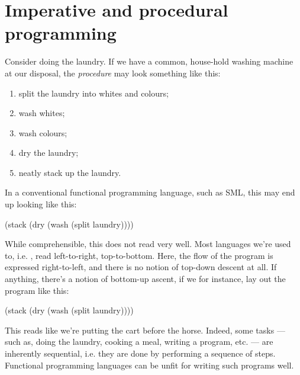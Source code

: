 \chapter{Imperative and procedural programming}

Consider doing the laundry. If we have a common, house-hold washing machine at
our disposal, the \emph{procedure} may look something like this:

\begin{enumerate}

\item split the laundry into whites and colours;

\item wash whites;

\item wash colours;

\item dry the laundry;

\item neatly stack up the laundry.

\end{enumerate}

In a conventional functional programming language, such as SML, this may end up
looking like this:

\begin{code}
(stack (dry (wash (split laundry))))
\end{code}

While comprehensible, this does not read very well. Most languages we're used
to, i.e. , read
left-to-right, top-to-bottom. Here, the flow of the program is expressed
right-to-left, and there is no notion of top-down descent at all. If anything,
there's a notion of bottom-up ascent, if we for instance, lay out the program
like this:

\begin{code}
(stack
  (dry
    (wash
      (split laundry))))
\end{code}

This reads like we're putting the cart before the horse. Indeed, some tasks ---
such as, doing the laundry, cooking a meal, writing a program, etc. --- are
inherently sequential, i.e. they are done by performing a sequence of steps.
Functional programming languages can be  unfit for writing such programs well.

